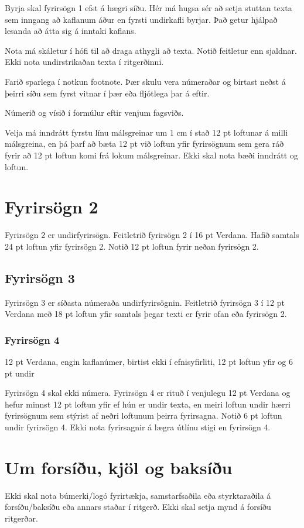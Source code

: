 \documentclass[a4paper,12pt,twoside,BCOR=10mm]{scrbook}
\begin{document}
Byrja skal fyrirsögn 1 efst á hægri síðu. Hér má hugsa sér að setja stuttan texta sem inngang að kaflanum áður en fyrsti undirkafli byrjar. Það getur hjálpað lesanda að átta sig á inntaki kaflans.

Nota má skáletur í hófi til að draga athygli að texta. Notið feitletur enn sjaldnar. Ekki nota undirstrikaðan texta í ritgerðinni.

Farið sparlega í notkun footnote. Þær skulu vera númeraðar og birtast neðst á þeirri síðu sem fyrst vitnar í þær eða fljótlega þar á eftir.

Númerið og vísið í formúlur eftir venjum fagsviðs.

Velja má inndrátt fyrstu línu málsgreinar um 1 cm í stað 12 pt loftunar á milli málsgreina, en þá þarf að bæta 12 pt við loftun yfir fyrirsögnum sem gera ráð fyrir að 12 pt loftun komi frá lokum málsgreinar. Ekki skal nota bæði inndrátt og loftun.

\section{Fyrirsögn 2}
Fyrirsögn 2 er undirfyrirsögn. Feitletrið fyrirsögn 2 í 16 pt Verdana. Hafið samtals 24 pt loftun yfir fyrirsögn 2. Notið 12 pt loftun fyrir neðan fyrirsögn 2.

\subsection{Fyrirsögn 3}
Fyrirsögn 3 er síðasta númeraða undirfyrirsögnin. Feitletrið fyrirsögn 3 í 12 pt Verdana með 18 pt loftun yfir samtals þegar texti er fyrir ofan eða fyrirsögn 2. 
\subsubsection{Fyrirsögn 4}
12 pt Verdana, engin kaflanúmer, birtist ekki í efnisyfirliti, 12 pt loftun yfir og 6 pt undir

Fyrirsögn 4 skal ekki númera. Fyrirsögn 4 er rituð í venjulegu 12 pt Verdana og hefur minnst 12 pt loftun yfir ef hún er undir texta, en meiri loftun undir hærri fyrirsögnum sem stýrist af neðri loftunum þeirra fyrirsagna. Notið 6 pt loftun undir fyrirsögn 4.
Ekki nota fyrirsagnir á lægra útlínu stigi en fyrirsögn 4.

\section{Um forsíðu, kjöl og baksíðu}
Ekki skal nota búmerki/logó fyrirtækja, samstarfsaðila eða styrktaraðila á forsíðu/baksíðu eða annars staðar í ritgerð. Ekki skal setja mynd á forsíðu ritgerðar. 
\end{document}

